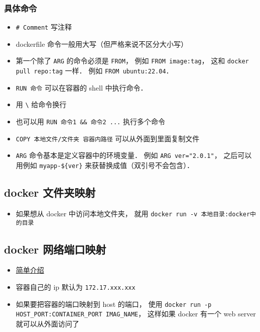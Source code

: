 \subsubsection{具体命令}
\begin{itemize}
\item \verb|# Comment| 写注释
\item dockerfile 命令一般用大写（但严格来说不区分大小写）
\item 第一个除了 \verb|ARG| 的命令必须是 \verb|FROM|， 例如 \verb|FROM image:tag|， 这和 \verb|docker pull repo:tag| 一样． 例如 \verb|FROM ubuntu:22.04|．
\item \verb|RUN 命令| 可以在容器的 shell 中执行命令．
\item 用 \verb|\| 给命令换行
\item 也可以用 \verb|RUN 命令1 && 命令2 ...| 执行多个命令
\item \verb|COPY 本地文件/文件夹 容器内路径| 可以从外面到里面复制文件
\item \verb|ARG| 命令基本是定义容器中的环境变量． 例如 \verb|ARG ver="2.0.1"|， 之后可以用例如 \verb|myapp-${ver}| 来获替换成值（双引号不会包含）．
\end{itemize}


\subsection{docker 文件夹映射}
\begin{itemize}
\item 如果想从 docker 中访问本地文件夹， 就用 \verb|docker run -v 本地目录:docker中的目录|
\end{itemize}

\subsection{docker 网络端口映射}
\begin{itemize}
\item \href{https://www.freecodecamp.org/news/how-to-get-a-docker-container-ip-address-explained-with-examples/}{简单介绍}
\item 容器自己的 ip 默认为 \verb`172.17.xxx.xxx`
\item 如果要把容器的端口映射到 host 的端口， 使用 \verb`docker run -p HOST_PORT:CONTAINER_PORT IMAG_NAME`， 这样如果 docker 有一个 web server 就可以从外面访问了
\end{itemize}

